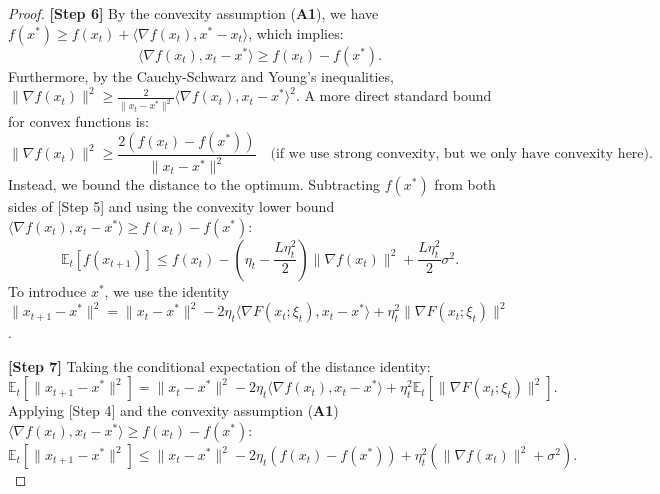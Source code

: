 \documentclass[11pt]{article}
\begin{document}
\begin{proof}
\textbf{[Step 6]} By the convexity assumption (\textbf{A1}), we have $f(x^*) \ge f(x_t) + \langle \nabla f(x_t), x^* - x_t \rangle$, which implies:
$$ \langle \nabla f(x_t), x_t - x^* \rangle \ge f(x_t) - f(x^*). $$
Furthermore, by the Cauchy-Schwarz and Young's inequalities, $\|\nabla f(x_t)\|^2 \ge \frac{2}{\|x_t - x^*\|^2} \langle \nabla f(x_t), x_t - x^* \rangle^2$. A more direct standard bound for convex functions is:
$$ \|\nabla f(x_t)\|^2 \ge \frac{2(f(x_t) - f(x^*))}{\|x_t - x^*\|^2} \quad \text{(if we use strong convexity, but we only have convexity here).} $$
Instead, we bound the distance to the optimum. Subtracting $f(x^*)$ from both sides of [Step 5] and using the convexity lower bound $\langle \nabla f(x_t), x_t - x^* \rangle \ge f(x_t) - f(x^*)$:
$$ \mathbb{E}_t[f(x_{t+1})] \le f(x_t) - \left( \eta_t - \frac{L \eta_t^2}{2} \right) \|\nabla f(x_t)\|^2 + \frac{L \eta_t^2}{2} \sigma^2. $$
To introduce $x^*$, we use the identity $\|x_{t+1} - x^*\|^2 = \|x_t - x^*\|^2 - 2\eta_t \langle \nabla F(x_t; \xi_t), x_t - x^* \rangle + \eta_t^2 \|\nabla F(x_t; \xi_t)\|^2$.

\textbf{[Step 7]} Taking the conditional expectation of the distance identity:
$$ \mathbb{E}_t[\|x_{t+1} - x^*\|^2] = \|x_t - x^*\|^2 - 2\eta_t \langle \nabla f(x_t), x_t - x^* \rangle + \eta_t^2 \mathbb{E}_t[\|\nabla F(x_t; \xi_t)\|^2]. $$
Applying [Step 4] and the convexity assumption (\textbf{A1}) $\langle \nabla f(x_t), x_t - x^* \rangle \ge f(x_t) - f(x^*)$:
$$ \mathbb{E}_t[\|x_{t+1} - x^*\|^2] \le \|x_t - x^*\|^2 - 2\eta_t (f(x_t) - f(x^*)) + \eta_t^2 (\|\nabla f(x_t)\|^2 + \sigma^2). $$


\end{proof}
\end{document}
